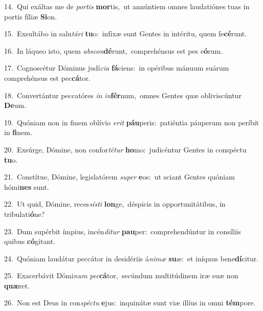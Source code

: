 {\numbfont\textcolor{\numbcolor}{14.}}~Qui exáltas me de \textit{por}\-\textit{tis} \textbf{mor}\-tis,~\star ut annúntiem omnes laudatiónes tuas in portis fíliæ \textbf{Si}\-on.\par
{\numbfont\textcolor{\numbcolor}{15.}}~Exsultábo in salu\-\textit{tá}\-\textit{ri} \textbf{tu}\-o:~\star infíxæ sunt Gentes in intéritu, quem fe\-\textbf{cé}\-runt.\par
{\numbfont\textcolor{\numbcolor}{16.}}~In láqueo isto, quem \textit{abs}\-\textit{con}\textbf{dé}runt,~\star comprehénsus est pes e\-\textbf{ó}\-rum.\par
{\numbfont\textcolor{\numbcolor}{17.}}~Cognoscétur Dóminus judí\-\textit{ci}\-\textit{a} \textbf{fá}\-ciens:~\star in opéribus mánuum suárum comprehénsus est pec\-\textbf{cá}\-tor.\par
{\numbfont\textcolor{\numbcolor}{18.}}~Convertántur peccatóres \textit{in} \textit{in}\-\textbf{fér}num,~\star omnes Gentes quæ obliviscúntur \textbf{De}\-um.\par
{\numbfont\textcolor{\numbcolor}{19.}}~Quóniam non in finem oblívio \textit{e}\-\textit{rit} \textbf{páu}\-peris:~\star patiéntia páuperum non períbit in \textbf{fi}\-nem.\par
{\numbfont\textcolor{\numbcolor}{20.}}~Exsúrge, Dómine, non confor\-\textit{té}\-\textit{tur} \textbf{ho}\-mo:~\star judicéntur Gentes in conspéctu \textbf{tu}\-o.\par
{\numbfont\textcolor{\numbcolor}{21.}}~Constítue, Dómine, legislatórem \textit{su}\-\textit{per} \textbf{e}\-os:~\star ut sciant Gentes quóniam hómi\textbf{nes} sunt.\par
{\numbfont\textcolor{\numbcolor}{22.}}~Ut quid, Dómine, reces\-\textit{sís}\-\textit{ti} \textbf{lon}\-ge,~\star déspicis in opportunitátibus, in tribulati\-\textbf{ó}\-ne?\par
{\numbfont\textcolor{\numbcolor}{23.}}~Dum supérbit ímpius, incén\-\textit{di}\-\textit{tur} \textbf{pau}\-per:~\star comprehendúntur in consíliis quibus \textbf{có}\-gitant.\par
{\numbfont\textcolor{\numbcolor}{24.}}~Quóniam laudátur peccátor in desidériis á\-\textit{ni}\-\textit{mæ} \textbf{su}\-æ:~\star et iníquus bene\-\textbf{dí}\-citur.\par
{\numbfont\textcolor{\numbcolor}{25.}}~Exacerbávit Dómi\textit{num} \textit{pec}\-\textbf{cá}tor,~\star secúndum multitúdinem iræ suæ non \textbf{quæ}\-ret.\par
{\numbfont\textcolor{\numbcolor}{26.}}~Non est Deus in con\-\textit{spéc}\-\textit{tu} \textbf{e}\-jus:~\star inquinátæ sunt viæ illíus in omni \textbf{tém}\-pore.\par
